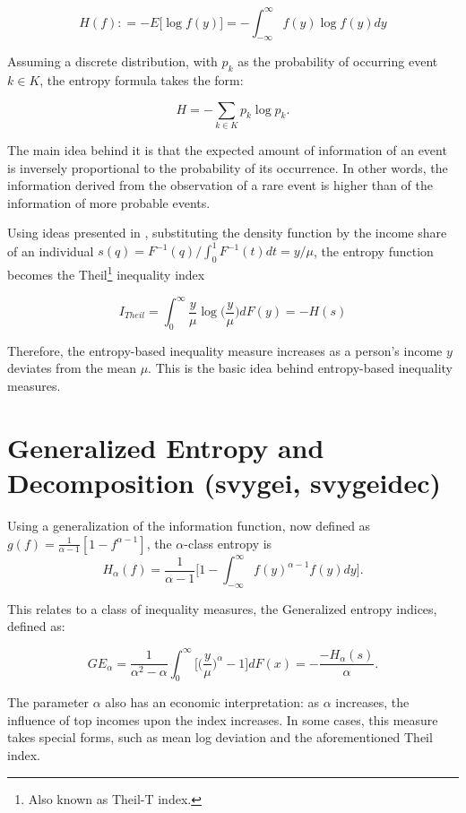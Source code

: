 \documentclass[]{book}
\let\rmarkdownfootnote\footnote%
\def\footnote{\protect\rmarkdownfootnote}
\begin{document}
\[
H(f) \colon = -E \big[ \log f(y) \big] = - \int_{-\infty}^{\infty} f(y) \log f(y) dy
\]

Assuming a discrete distribution, with \(p_k\) as the probability of
occurring event \(k \in K\), the entropy formula takes the form:

\[
H = - \sum_{k \in K} p_k \log p_k \text{.}
\]

The main idea behind it is that the expected amount of information of an
event is inversely proportional to the probability of its occurrence. In
other words, the information derived from the observation of a rare
event is higher than of the information of more probable events.

Using ideas presented in \citet{cowell2009}, substituting the density
function by the income share of an individual
\(s(q) = {F}^{-1}(q) / \int_{0}^{1} F^{-1}(t)dt = y/\mu\), the entropy
function becomes the Theil\footnote{Also known as Theil-T index.}
inequality index

\[
I_{Theil} = \int_{0}^{\infty} \frac{y}{\mu} \log \bigg( \frac{y}{\mu} \bigg) dF(y) = -H(s)
\]

Therefore, the entropy-based inequality measure increases as a person's
income \(y\) deviates from the mean \(\mu\). This is the basic idea
behind entropy-based inequality measures.

\section{Generalized Entropy and Decomposition (svygei,
svygeidec)}\label{generalized-entropy-and-decomposition-svygei-svygeidec}

Using a generalization of the information function, now defined as
\(g(f) = \frac{1}{\alpha-1} [ 1 - f^{\alpha - 1} ]\), the
\(\alpha\)-class entropy is \[
H_\alpha(f) = \frac{1}{\alpha - 1} \bigg[ 1 - \int_{-\infty}^{\infty} f(y)^{ \alpha - 1} f(y) dy \bigg] \text{.}
\]

This relates to a class of inequality measures, the Generalized entropy
indices, defined as:

\[
GE_\alpha = \frac{1}{\alpha^2 - \alpha} \int_{0}^\infty \bigg[ \bigg( \frac{y}{\mu} \bigg)^\alpha - 1 \bigg]dF(x) = - \frac{-H_\alpha(s) }{ \alpha } \text{.}
\]

The parameter \(\alpha\) also has an economic interpretation: as
\(\alpha\) increases, the influence of top incomes upon the index
increases. In some cases, this measure takes special forms, such as mean
log deviation and the aforementioned Theil index.
\end{document}
